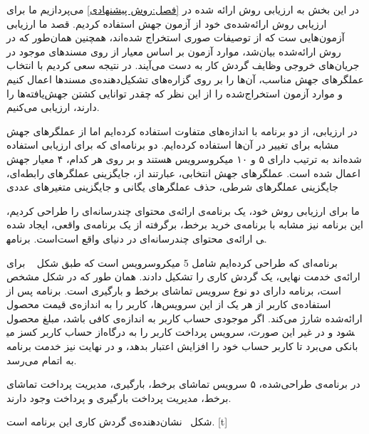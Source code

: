 

در این بخش به ارزیابی روش ارائه شده در 
 \autoref{فصل:روش پیشنهادی}
می‌پردازیم ما برای ارزیابی روش ارائه‌‌شده‌ی خود از آزمون جهش استفاده کردیم. قصد ما ارزیابی آزمون‌هایی ست که از توصیفات صوری استخراج شده‌اند،  همچنین همان‌طور که در روش ارائه‌شده بیان‌شد، موارد آزمون بر اساس معیار  از روی مسند‌های موجود در جریان‌های خروجی وظایف گردش کار به دست می‌آیند. در نتیجه سعی کردیم با انتخاب عملگر‌های جهش مناسب، آن‌ها را بر روی گزاره‌های تشکیل‌دهنده‌ی مسند‌ها اعمال کنیم و موارد آزمون استخراج‌شده را از این نظر که چقدر توانایی کشتن جهش‌یافته‌ها را دارند، ارزیابی می‌کنیم.

در ارزیابی، از دو برنامه با اندازه‌های متفاوت استفاده کرده‌ایم اما از عملگر‌های جهش مشابه برای تغییر در آن‌ها استفاده کرده‌ایم. 
دو برنامه‌ای که برای ارزیابی استفاده شده‌اند به ترتیب دارای ۵ و ۱۰ میکروسرویس هستند و بر روی هر کدام، ۴ معیار جهش اعمال شده‌ است. عملگرهای جهش انتخابی، عبارتند از، جایگزینی عملگرهای رابطه‌ای، جایگزینی عملگرهای شرطی، حذف عملگرهای یگانی و جایگزینی متغیرهای عددی 


ما برای ارزیابی روش خود، یک برنامه‌ی ارائه‌ی محتوای چندرسانه‌ای را طراحی کردیم، این برنامه نیز مشابه با برنامه‌ی خرید برخط، برگرفته از یک برنامه‌ی واقعی، ایجاد شده است.  برنامه‎ی ارائه‌ی محتوای چندرسانه‌ای در دنیای واقع است. 

برنامه‌ای که طراحی کرده‌ایم شامل 5 میکروسرویس است که طبق شکل ~ برای ارائه‌ی خدمت نهایی، یک گردش کاری را تشکیل دادند. همان طور که در شکل مشخص است، برنامه دارای دو نوع سرویس تماشای برخط و بارگیری است. برنامه پس از استفاده‌ی کاربر از هر یک از این سرویس‌ها، کاربر را به اندازه‌ی قیمت محصول ارائه‌شده شارژ می‌کند. اگر موجودی حساب کاربر به اندازه‌ی کافی باشد، مبلغ محصول از حساب کاربر کسز می‎شود و در غیر این صورت، سرویس پرداخت کاربر را به درگاه بانکی می‌برد تا کاربر حساب خود را افزایش اعتبار بدهد، و در نهایت نیز خدمت برنامه به اتمام می‌رسد. 

در برنامه‌ی طراحی‌شده، ۵ سرویس تماشای برخط، بارگیری، مدیریت پرداخت تماشای برخط، مدیریت پرداخت بارگیری و پرداخت وجود دارند.

شکل~ نشان‌دهنده‌ی گردش کاری این برنامه است.
[t]
\vspace{0.5em}

